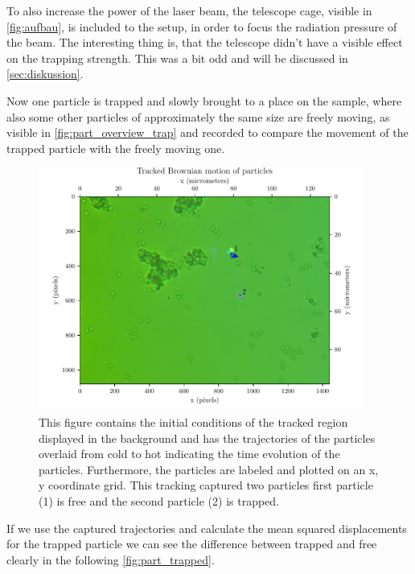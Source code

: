 \documentclass[12pt,english,ngerman]{scrartcl}
\begin{document}
To also increase the power of the laser beam, the telescope cage, visible in
\autoref{fig:aufbau}, is included to the setup, in order to focus the radiation
pressure of the beam. The interesting thing is, that the telescope didn't have
a visible effect on the trapping strength. This was a bit odd and will be
discussed in \autoref{sec:diskussion}.

Now one particle is trapped and slowly brought to a place on the sample, where
also some other particles of approximately the same size are freely moving, as
visible in \autoref{fig:part_overview_trap} and recorded to compare the
movement of the trapped particle with the freely moving one.

\begin{figure}[H]
	\centering
	\includegraphics[width=0.95\textwidth]{figures/III_tracked.pdf}
	\caption[Capture of trapped particle]{This figure contains the initial conditions of the
		tracked region displayed in the background and has the trajectories of the
		particles overlaid from cold to hot indicating the time evolution of the
		particles. Furthermore, the particles are labeled and plotted on an x, y
		coordinate grid. This tracking captured two particles first particle (1) is
		free and the second particle (2) is trapped.
	}\label{fig:part_overview_trap}
\end{figure}

If we use the captured trajectories and calculate the mean squared
displacements for the trapped particle we can see the difference between
trapped and free clearly in the following \autoref{fig:part_trapped}.
\end{document}
